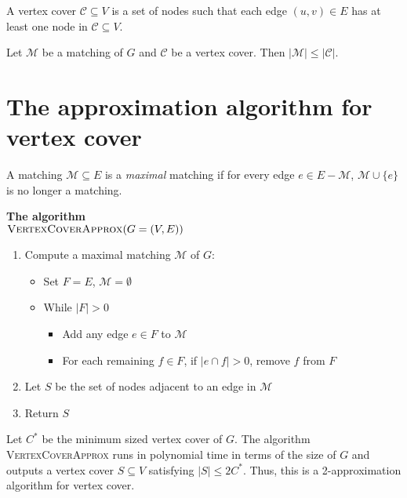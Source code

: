 \documentclass[11  pt]{article}
\begin{document}
	A vertex cover $\mathcal{C} \subseteq V$ is a set of nodes such that each edge $(u,v) \in E$ has at least one node in $\mathcal{C} \subseteq V$.\\
	\vspace{5cm} 
	
	
	\begin{lemma}
		Let $\mathcal{M}$ be a matching of $G$ and $\mathcal{C}$ be a vertex cover. Then $|\mathcal{M}| \leq |\mathcal{C}|$.
	\end{lemma}

	
	

	
	\newpage
	\section{The approximation algorithm for vertex cover}
	A matching $\mathcal{M} \subseteq E$ is a \emph{maximal} matching if for every edge $e \in E - \mathcal{M}$, $\mathcal{M} \cup \{e\}$ is no longer a matching. \\
	
	
	\vspace{8cm}
	
	
	\textbf{The algorithm}\\
	
	$\textsc{VertexCoverApprox}(G = (V,E))$
	\begin{enumerate}
		\item Compute a maximal matching $\mathcal{M}$ of $G$:
		\begin{itemize}
			\item Set $F = E$, $\mathcal{M} = \emptyset$
			\item While $|F| > 0$
			\begin{itemize}
				\item Add any edge $e \in F$ to $\mathcal{M}$
				\item For each remaining $f \in F$, if $|e \cap f| > 0$, remove $f$ from $F$
			\end{itemize}
		\end{itemize}
		\item Let $S$ be the set of nodes adjacent to an edge in $\mathcal{M}$
		\item Return $S$\\
	\end{enumerate}
	
	\newpage
	\begin{theorem}
		Let $C^*$ be the minimum sized vertex cover of $G$. The algorithm \textsc{VertexCoverApprox} runs in polynomial time in terms of the size of $G$ and outputs a vertex cover $S \subseteq V$ satisfying $|S| \leq 2C^*$. Thus, this is a 2-approximation algorithm for vertex cover.
	\end{theorem}


	
\end{document}
